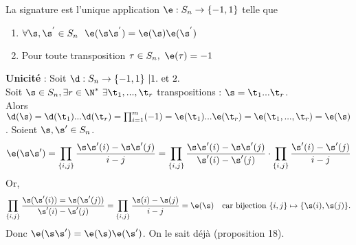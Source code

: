 \documentclass[11pt]{article}
\begin{document}
\begin{thm}{}{}
    La signature est l'unique application $\e : S_{n} \to \{ -1, 1 \}$ telle que
    \begin{enumerate}[topsep=0pt,itemsep=-0.9 ex]
        \item $\forall \s, \s^{'} \in S_{n} ~~ \e(\s \s^{'}) = \e(\s) \e(\s^{'})$
        \item Pour toute transposition $\tau \in S_{n}, ~ \e(\tau) = -1$
    \end{enumerate}
    \tcblower
    \textbf{Unicité} : Soit $\d:S_n\to\{-1,1\} ~ | 1. \text{ et } 2.$\\
    Soit $\s\in S_n, \exists r\in\N^* ~ \exists \t_1,...,\t_r$ transpositions : $\s=\t_1...\t_r$.\\
    Alors $\d(\s)=\d(\t_1)...\d(\t_r)=\prod_{i=1}^m(-1)=\e(\t_1)...\e(\t_r)=\e(\t_1,...,\t_r)=\e(\s)$.\n
     Soient $\s,\s'\in S_n$.
    \begin{equation*}
        \e(\s\s')=\prod_{\{i,j\}}\frac{\s\s'(i)-\s\s'(j)}{i-j}=\prod_{\{i,j\}}\frac{\s\s'(i)-\s\s'(j)}{\s'(i)-\s'(j)}\cdot\prod_{\{i,j\}}\frac{\s'(i)-\s'(j)}{i-j}
    \end{equation*}
    Or, 
    \begin{equation*}
        \prod_{\{i,j\}}\frac{\s(\s'(i))=\s(\s'(j))}{\s'(i)-\s'(j)}=\prod_{\{i,j\}}\frac{\s(i)-\s(j)}{i-j}=\e(\s) \quad \text{car bijection } \{i,j\}\mapsto\{\s(i),\s(j)\}.
    \end{equation*}
    Donc $\e(\s\s')=\e(\s)\e(\s')$.\n
     On le sait déjà (proposition 18).
\end{thm}
\end{document}
